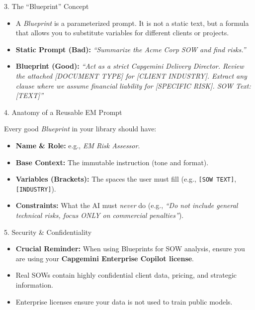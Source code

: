 \documentclass[aspectratio=169]{beamer}
\begin{document}
\begin{frame}{3. The ``Blueprint'' Concept}


\begin{itemize}
  \item A \textit{Blueprint} is a parameterized prompt. It is not a static text, but a formula that allows you to substitute variables for different clients or projects.
  \item \textbf{Static Prompt (Bad):} \textit{``Summarize the Acme Corp SOW and find risks.''}
  \item \textbf{Blueprint (Good):} \textit{``Act as a strict Capgemini Delivery Director. Review the attached [DOCUMENT TYPE] for [CLIENT INDUSTRY]. Extract any clause where we assume financial liability for [SPECIFIC RISK]. SOW Text: [TEXT]''}
\end{itemize}
\end{frame}

\begin{frame}{4. Anatomy of a Reusable EM Prompt}


Every good \textit{Blueprint} in your library should have:

\begin{itemize}
  \item \textbf{Name \& Role:} e.g., \textit{EM Risk Assessor}.
  \item \textbf{Base Context:} The immutable instruction (tone and format).
  \item \textbf{Variables (Brackets):} The spaces the user must fill (e.g., \texttt{[SOW TEXT]}, \texttt{[INDUSTRY]}).
  \item \textbf{Constraints:} What the AI must \textit{never} do (e.g., \textit{``Do not include general technical risks, focus ONLY on commercial penalties''}).
\end{itemize}
\end{frame}

\begin{frame}{5. Security \& Confidentiality}


\begin{itemize}
  \item \textbf{Crucial Reminder:} When using Blueprints for SOW analysis, ensure you are using your \textbf{Capgemini Enterprise Copilot license}.
  \item Real SOWs contain highly confidential client data, pricing, and strategic information.
  \item Enterprise licenses ensure your data is not used to train public models.
\end{itemize}
\end{frame}
\end{document}
